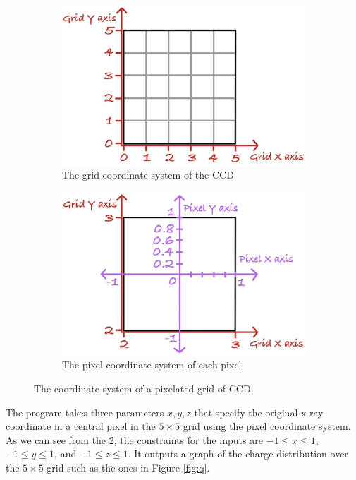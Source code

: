 \documentclass{article}
\begin{document}
\begin{figure}[H]
\centering
\begin{subfigure}{.5\textwidth}
  \centering
  \includegraphics[width=1\linewidth]{images/grid1.png}
  \caption{The grid coordinate system of the CCD}
  \label{fig:grid}
\end{subfigure}%
\begin{subfigure}{.5\textwidth}
  \centering
  \includegraphics[width=1\linewidth]{images/grid2.png}
  \caption{The pixel coordinate system of each pixel}
  \label{fig:pixel}
\end{subfigure}
\caption{The coordinate system of a pixelated grid of CCD}
\label{fig:test}
\end{figure}

The program takes three parameters $x,y,z$ that specify the original x-ray coordinate in a central pixel in the $5\times 5$ grid using the pixel coordinate system. As we can see from the \ref{fig:pixel}, the constraints for the inputs are $-1\leq x \leq 1$, $-1\leq y \leq 1$, and $-1\leq z \leq 1$. It outputs a graph of the charge distribution over the $5\times 5$ grid such as the ones in Figure \ref{fig:q}.
\end{document}
